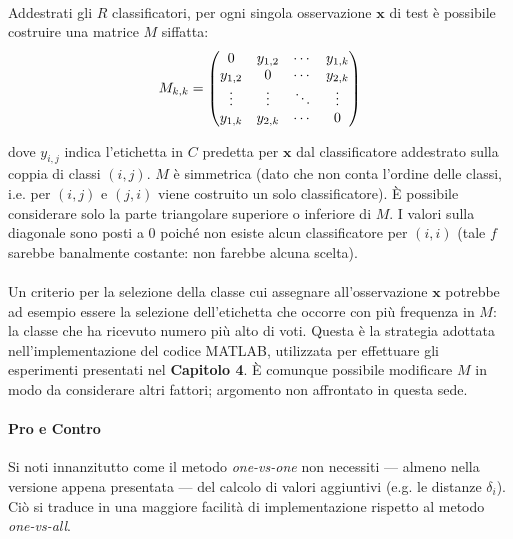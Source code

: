 \paragraph{}
Addestrati gli $R$ classificatori, per ogni singola osservazione $\boldsymbol{x}$ di test è possibile costruire una matrice $M$ siffatta:
\begin{equation}
M_{k, k} =
\begin{pmatrix}
	0 & y_{1,2} & \cdots & y_{1,k} \\
  	y_{1,2} & 0 & \cdots & y_{2,k} \\
  	\vdots  & \vdots  & \ddots & \vdots  \\
  	y_{1,k} & y_{2, k} & \cdots & 0
\end{pmatrix}
\vspace{2mm}
\end{equation}

dove $y_{i,j}$ indica l'etichetta in $C$ predetta per $\boldsymbol{x}$ dal classificatore addestrato sulla coppia di classi $(i, j)$. $M$ è simmetrica (dato che non conta l'ordine delle classi, i.e. per $(i, j)$ e $(j, i)$ viene costruito un solo classificatore). È possibile considerare solo la parte triangolare superiore o inferiore di $M$. I valori sulla diagonale sono posti a $0$ poiché non esiste alcun classificatore per $(i, i)$ (tale $f$ sarebbe banalmente costante: non farebbe alcuna scelta).

\paragraph{}
Un criterio per la selezione della classe cui assegnare all'osservazione $\boldsymbol{x}$ potrebbe ad esempio essere la selezione dell'etichetta che occorre con più frequenza in $M$: la classe che ha ricevuto numero più alto di voti.
Questa è la strategia adottata nell'implementazione del codice MATLAB, utilizzata per effettuare gli esperimenti presentati nel \textbf{Capitolo 4}. 
È comunque possibile modificare $M$ in modo da considerare altri fattori; argomento non affrontato in questa sede.

\paragraph{Pro e Contro}
Si noti innanzitutto come il metodo \textit{one-vs-one} non necessiti --- almeno nella versione appena presentata --- del calcolo di valori aggiuntivi (e.g. le distanze $\delta_i$).
Ciò si traduce in una maggiore facilità di implementazione rispetto al metodo \textit{one-vs-all}.

